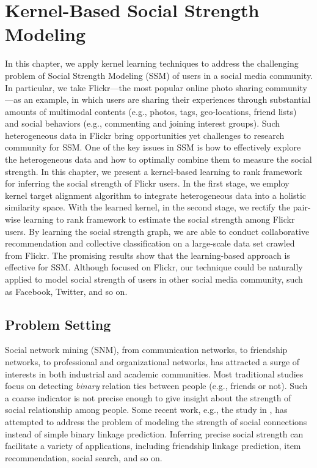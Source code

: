 \chapter{Kernel-Based Social Strength Modeling} \label{sec:ssm-framework}

In this chapter, we apply kernel learning techniques to address the challenging problem of Social Strength Modeling (SSM) of users in a social media community. In particular, we take Flickr---the most popular online photo sharing community---as an example, in which users are sharing their experiences through substantial amounts of multimodal contents (e.g., photos, tags, geo-locations, friend lists) and social behaviors (e.g., commenting and joining interest groups). Such heterogeneous data in Flickr bring opportunities yet challenges to research community for SSM. One of the key issues in SSM  is how to effectively explore the heterogeneous data and how to optimally combine them to measure the social strength. In this chapter, we present a kernel-based learning to rank framework for inferring the social strength of Flickr users. In the first stage, we employ kernel target alignment algorithm to integrate heterogeneous data into a holistic similarity space. With the learned kernel, in the second stage, we rectify the pair-wise learning to rank framework to estimate the social strength among Flickr users. By learning the social strength graph, we are able to conduct collaborative recommendation and collective classification on a large-scale data set crawled from Flickr. The promising results show that the learning-based approach is effective for SSM. Although focused on Flickr, our technique could be naturally applied to model social strength of users in other social media community, such as Facebook, Twitter, and so on.

\section{Problem Setting}\label{sec:ssm-formulation}

Social network mining (SNM), from communication networks, to friendship networks, to professional and organizational networks,
has attracted a surge of interests in both industrial and academic communities. Most traditional studies focus on detecting {\em
binary} relation ties between people (e.g., friends or not). Such a coarse indicator is not precise enough to give insight about the strength of
social relationship among people. Some recent work, e.g., the study in \cite{www/XiangNR10}, has attempted to address the problem of {modeling the strength of
social connections} instead of simple binary linkage prediction. Inferring precise social strength can facilitate a variety of applications, including
friendship linkage prediction, item recommendation, social search, and so on.


